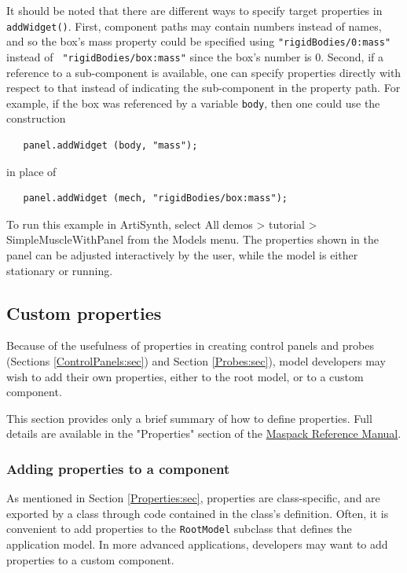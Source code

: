 \begin{sideblock}
It should be noted that there are different ways to specify target
properties in {\tt addWidget()}. First, component paths may contain
numbers instead of names, and so the box's mass property could be
specified using {\tt "rigidBodies/0:mass"} instead of {\tt
"rigidBodies/box:mass"} since the box's number is 0. Second, if a
reference to a sub-component is available, one can specify properties
directly with respect to that instead of indicating the sub-component
in the property path. For example, if the box was referenced by a
variable {\tt body}, then one could use the construction
%
\begin{verbatim}
   panel.addWidget (body, "mass");
\end{verbatim}
%
in place of 
%
\begin{verbatim}
   panel.addWidget (mech, "rigidBodies/box:mass");
\end{verbatim}
%
\end{sideblock}

To run this example in ArtiSynth, select {\sf All demos > tutorial >
SimpleMuscleWithPanel} from the {\sf Models} menu. The properties 
shown in the panel can be adjusted interactively by the user,
while the model is either stationary or running.

\subsection{Custom properties}
\label{CustomProperties:sec}

Because of the usefulness of properties in creating control panels and
probes (Sections \ref{ControlPanels:sec}) and Section
\ref{Probes:sec}), model developers may wish to add their own
properties, either to the root model, or to a custom component.

This section provides only a brief summary of how to define
properties. Full details are available in the "Properties" section of
the \href{http://www.artisynth.org/doc/html/maspack/maspack.html}{
Maspack Reference Manual}.

\subsubsection{Adding properties to a component}

As mentioned in Section \ref{Properties:sec}, properties are
class-specific, and are exported by a class through code contained in
the class's definition.  Often, it is convenient to add properties to
the {\tt RootModel} subclass that defines the application model. In
more advanced applications, developers may want to add properties to a
custom component.

